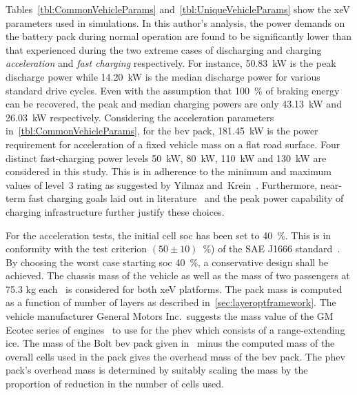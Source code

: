 Tables~\ref{tbl:CommonVehicleParams} and~\ref{tbl:UniqueVehicleParams}  show the
\gls{xeV}  parameters  used  in  simulations. In  this  author's  analysis,  the
power  demands on  the battery  pack  during normal  operation are  found to  be
significantly  lower than  that  experienced  during the  two  extreme cases  of
discharging  and charging  \viz{} \emph{acceleration}  and \emph{fast  charging}
respectively. For  instance, \SI{50.83}{\kilo\watt} is the  peak discharge power
while \SI{14.20}{\kilo\watt} is the median  discharge power for various standard
drive  cycles.  Even with  the  assumption  that \SI{100}{\percent}  of  braking
energy  can  be  recovered,  the  peak  and  median  charging  powers  are  only
\SI{43.13}{\kilo\watt} and \SI{26.03}{\kilo\watt}  respectively. Considering the
acceleration  parameters  in~\cref{tbl:CommonVehicleParams}, for  the  \gls{bev}
pack, \SI{181.45}{\kilo\watt}  is the  power requirement  for acceleration  of a
fixed vehicle  mass on a  flat road  surface. Four distinct  fast-charging power
levels \viz{} \SI{50}{\kilo\watt}, \SI{80}{\kilo\watt}, \SI{110}{\kilo\watt} and
\SI{130}{\kilo\watt}  are considered  in this  study.  This is  in adherence  to
the  minimum  and maximum  values  of  level~3  rating  as suggested  by  Yilmaz
and~Krein~\cite{Yilmaz2012}. Furthermore, near-term fast charging goals laid out
in  literature~\cite{Ashique2017,Srdic2016} and  the  peak  power capability  of
charging infrastructure further justify these choices.



For  the  acceleration  tests,  the  initial cell  \gls{soc}  has  been  set  to
\SI{40}{\percent}.  This  is  in  conformity with  the  test  criterion  $(50\pm
10)$~\%)  of  the  SAE  J1666 standard~\cite{Sae2010}.  By  choosing  the  worst
case  starting \gls{soc}  \ie{} \SI{40}{\percent},  a conservative  design shall
be  achieved.  The  chassis  mass  of  the  vehicle  as  well  as  the  mass  of
two  passengers   at  75.3  kg   each~\cite{Sae2010}  is  considered   for  both
\gls{xeV}  platforms. The  pack mass  is  computed as  a function  of number  of
layers  as described  in~\cref{sec:layeroptframework}. The  vehicle manufacturer
General  Motors  Inc.\ suggests  the  mass  value of  the  GM  Ecotec series  of
engines~\cite{motortrendEcotec}  to use  for  the \gls{phev}  which consists  of
a  range-extending  \gls{ice}.  The  mass  of  the  Bolt  \gls{bev}  pack  given
in~\cite{ChevyBoltSpecs} minus  the computed mass  of the overall cells  used in
the pack  gives the overhead mass  of the \gls{bev} pack.  The \gls{phev} pack's
overhead mass  is determined by suitably  scaling the mass by  the proportion of
reduction in the number of cells used.

